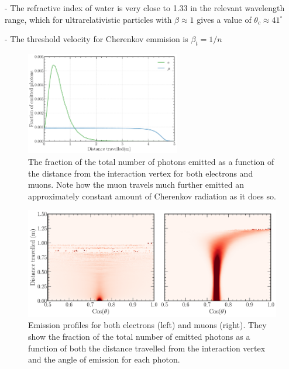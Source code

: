 - The refractive index of water is very close to 1.33 in the relevant wavelength range, which for
ultrarelativistic particles with $\beta\approx 1$ gives a value of $\theta_{c}\approx 41^{\circ}$

- The threshold velocity for Cherenkov emmision is $\beta_{t}=1/n$

\begin{figure} %
    \includegraphics[width=0.6\textwidth]{diagrams/4-chips/emission_distance.pdf}
    \caption[Fraction of Cherenkov photons emitted as a function of distance.]
    {The fraction of the total number of photons emitted as a function of the distance from the
        interaction vertex for both electrons and muons. Note how the muon travels much further
        emitted an approximately constant amount of Cherenkov radiation as it does so.}
    \label{fig:emission distance}
\end{figure}

\begin{figure} %
    \includegraphics[width=\textwidth]{diagrams/4-chips/emission_profile.pdf}
    \caption[Emission profiles for both electrons and muons]
    {Emission profiles for both electrons (left) and muons (right). They show the fraction of the
        total number of emitted photons as a function of both the distance travelled from the
        interaction vertex and the angle of emission for each photon.}
    \label{fig:emission_profile}
\end{figure}


